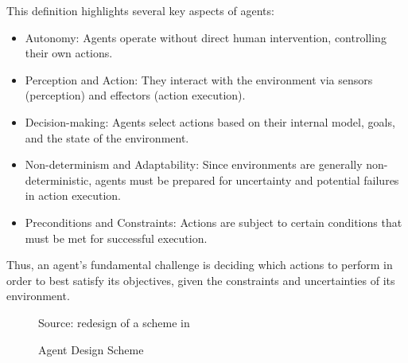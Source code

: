 This definition highlights several key aspects of agents:
\begin{itemize}
  \item Autonomy: Agents operate without direct human intervention, controlling their
    own actions.

  \item Perception and Action: They interact with the environment via sensors (perception)
    and effectors (action execution).

  \item Decision-making: Agents select actions based on their internal model, goals,
    and the state of the environment.

  \item Non-determinism and Adaptability: Since environments are generally non-deterministic,
    agents must be prepared for uncertainty and potential failures in action execution.

  \item Preconditions and Constraints: Actions are subject to certain conditions
    that must be met for successful execution.
\end{itemize}

Thus, an agent's fundamental challenge is deciding which actions to perform in
order to best satisfy its objectives, given the constraints and uncertainties of
its environment.

\begin{figure}[h!]
  \centering
  \caption{Agent Design Scheme}
  { Source: redesign of a scheme in \cite{wooldridge2002multiagent}} \label{fig:agent_scheme}
\end{figure}

